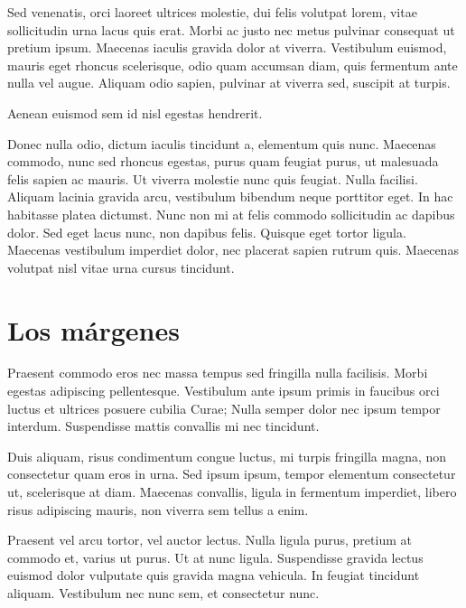 \documentclass[12pt,a4paper]{report}
\begin{document}
Sed venenatis, orci laoreet ultrices molestie, dui felis volutpat lorem, vitae sollicitudin urna lacus quis erat. Morbi ac justo nec metus pulvinar consequat ut pretium ipsum. Maecenas iaculis gravida dolor at viverra. Vestibulum euismod, mauris eget rhoncus scelerisque, odio quam accumsan diam, quis fermentum ante nulla vel augue. Aliquam odio sapien, pulvinar at viverra sed, suscipit at turpis. 

Aenean euismod sem id nisl egestas hendrerit.

Donec nulla odio, dictum iaculis tincidunt a, elementum quis nunc. Maecenas commodo, nunc sed rhoncus egestas, purus quam feugiat purus, ut malesuada felis sapien ac mauris. Ut viverra molestie nunc quis feugiat. Nulla facilisi. Aliquam lacinia gravida arcu, vestibulum bibendum neque porttitor eget. In hac habitasse platea dictumst. Nunc non mi at felis commodo sollicitudin ac dapibus dolor. Sed eget lacus nunc, non dapibus felis. Quisque eget tortor ligula. Maecenas vestibulum imperdiet dolor, nec placerat sapien rutrum quis. Maecenas volutpat nisl vitae urna cursus tincidunt. 





\section{Los márgenes}
\label{seccion.margenes}



Praesent commodo eros nec massa tempus sed fringilla nulla facilisis. Morbi egestas adipiscing pellentesque. Vestibulum ante ipsum primis in faucibus orci luctus et ultrices posuere cubilia Curae; Nulla semper dolor nec ipsum tempor interdum. Suspendisse mattis convallis mi nec tincidunt. 

Duis aliquam, risus condimentum congue luctus, mi turpis fringilla magna, non consectetur quam eros in urna. Sed ipsum ipsum, tempor elementum consectetur ut, scelerisque at diam. Maecenas convallis, ligula in fermentum imperdiet, libero risus adipiscing mauris, non viverra sem tellus a enim.

Praesent vel arcu tortor, vel auctor lectus. Nulla ligula purus, pretium at commodo et, varius ut purus. Ut at nunc ligula. Suspendisse gravida lectus euismod dolor vulputate quis gravida magna vehicula. In feugiat tincidunt aliquam. Vestibulum nec nunc sem, et consectetur nunc. 
\end{document}

